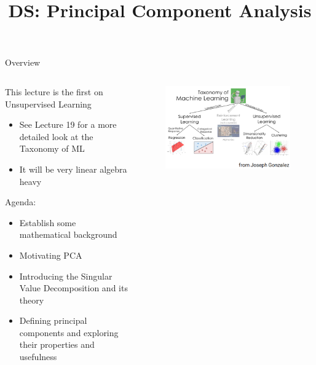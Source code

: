 \documentclass[aspectratio=169]{../latex_main/tntbeamer}  %
\title[Introduction]{DS: Principal Component Analysis}
\subtitle{}
\begin{document}
	
	\maketitle
	\begin{frame}{Overview}
	    \begin{columns}
	        \begin{column}{.5\textwidth}
	        This lecture is the first on Unsupervised Learning
	            \begin{itemize}
	                \item See Lecture 19 for a more detailed look at the Taxonomy of ML
	                \item It will be very linear algebra heavy
	            \end{itemize}
	            Agenda:
	            \begin{itemize}
	                \item Establish some mathematical background
	                \item Motivating PCA
	                \item Introducing the Singular Value Decomposition and its theory
	                \item Defining principal components and exploring their properties and usefulness
	            \end{itemize}
	        \end{column}
	        
	        
	        \begin{column}{.5\textwidth}
	            \begin{figure}
	                \centering
	                \includegraphics[scale=.45]{Bild1}
	            \end{figure}
	        \end{column}
	    \end{columns}
	\end{frame}
	
	
\end{document}
